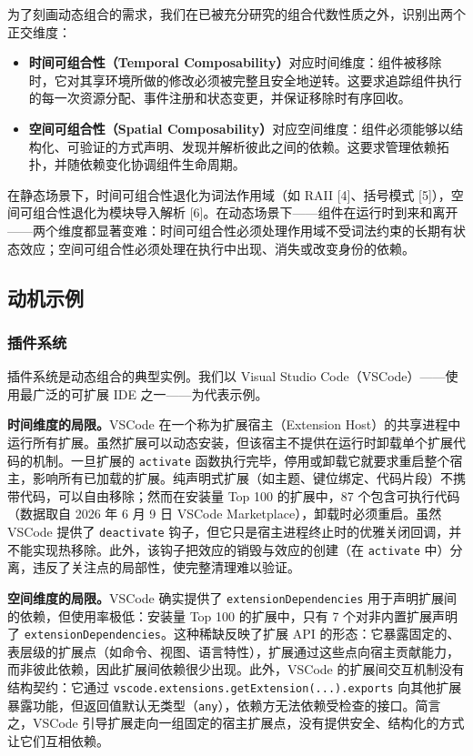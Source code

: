\documentclass[11pt,a4paper]{article}
\theoremstyle{plain}
\theoremstyle{definition}
\theoremstyle{remark}
\begin{document}
为了刻画动态组合的需求，我们在已被充分研究的组合代数性质之外，识别出两个正交维度：

\begin{itemize}
\item \textbf{时间可组合性（Temporal Composability）}对应时间维度：组件被移除时，它对其享环境所做的修改必须被完整且安全地逆转。这要求追踪组件执行的每一次资源分配、事件注册和状态变更，并保证移除时有序回收。
\item \textbf{空间可组合性（Spatial Composability）}对应空间维度：组件必须能够以结构化、可验证的方式声明、发现并解析彼此之间的依赖。这要求管理依赖拓扑，并随依赖变化协调组件生命周期。
\end{itemize}

在静态场景下，时间可组合性退化为词法作用域（如 RAII [4]、括号模式 [5]），空间可组合性退化为模块导入解析 [6]。在动态场景下——组件在运行时到来和离开——两个维度都显著变难：时间可组合性必须处理作用域不受词法约束的长期有状态效应；空间可组合性必须处理在执行中出现、消失或改变身份的依赖。

\subsection{动机示例}

\subsubsection{插件系统}

插件系统是动态组合的典型实例。我们以 Visual Studio Code（VSCode）——使用最广泛的可扩展 IDE 之一——为代表示例。

\textbf{时间维度的局限。}VSCode 在一个称为扩展宿主（Extension Host）的共享进程中运行所有扩展。虽然扩展可以动态安装，但该宿主不提供在运行时卸载单个扩展代码的机制。一旦扩展的 \texttt{activate} 函数执行完毕，停用或卸载它就要求重启整个宿主，影响所有已加载的扩展。纯声明式扩展（如主题、键位绑定、代码片段）不携带代码，可以自由移除；然而在安装量 Top 100 的扩展中，87 个包含可执行代码（数据取自 2026 年 6 月 9 日 VSCode Marketplace），卸载时必须重启。虽然 VSCode 提供了 \texttt{deactivate} 钩子，但它只是宿主进程终止时的优雅关闭回调，并不能实现热移除。此外，该钩子把效应的销毁与效应的创建（在 \texttt{activate} 中）分离，违反了关注点的局部性，使完整清理难以验证。

\textbf{空间维度的局限。}VSCode 确实提供了 \texttt{extensionDependencies} 用于声明扩展间的依赖，但使用率极低：安装量 Top 100 的扩展中，只有 7 个对非内置扩展声明了 \texttt{extensionDependencies}。这种稀缺反映了扩展 API 的形态：它暴露固定的、表层级的扩展点（如命令、视图、语言特性），扩展通过这些点向宿主贡献能力，而非彼此依赖，因此扩展间依赖很少出现。此外，VSCode 的扩展间交互机制没有结构契约：它通过 \texttt{vscode.extensions.getExtension(...).exports} 向其他扩展暴露功能，但返回值默认无类型（\texttt{any}），依赖方无法依赖受检查的接口。简言之，VSCode 引导扩展走向一组固定的宿主扩展点，没有提供安全、结构化的方式让它们互相依赖。
\end{document}
